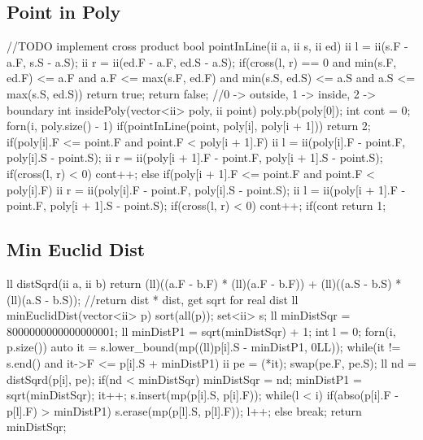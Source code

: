 \documentclass[10pt, landscape, twocolumn, a4paper, notitlepage]{article}
\begin{document}
\subsection{Point in Poly}
\begin{code}
//TODO implement cross product
bool pointInLine(ii a, ii s, ii ed) {
    ii l = ii(s.F - a.F, s.S - a.S);
    ii r = ii(ed.F - a.F, ed.S - a.S);
    if(cross(l, r) == 0 and min(s.F, ed.F) <= a.F and a.F <= max(s.F, ed.F)
        and min(s.S, ed.S) <= a.S and a.S <= max(s.S, ed.S)) 
        return true;
    return false;
}
//0 -> outside, 1 -> inside, 2 -> boundary
int insidePoly(vector<ii> poly, ii point) {
    poly.pb(poly[0]);
    int cont = 0;
    forn(i, poly.size() - 1) {
        if(pointInLine(point, poly[i], poly[i + 1])) return 2;
        if(poly[i].F <= point.F and point.F < poly[i + 1].F) {
            ii l = ii(poly[i].F - point.F, poly[i].S - point.S);
            ii r = ii(poly[i + 1].F - point.F, poly[i + 1].S - point.S);
            if(cross(l, r) < 0) cont++;
        }
        else if(poly[i + 1].F <= point.F and point.F < poly[i].F) {
            ii r = ii(poly[i].F - point.F, poly[i].S - point.S);
            ii l = ii(poly[i + 1].F - point.F, poly[i + 1].S - point.S);
            if(cross(l, r) < 0) cont++;
        }
    }
    if(cont%
    return 1;
}
\end{code}
\subsection{Min Euclid Dist}
\begin{code}
ll distSqrd(ii a, ii b) {
    return (ll)((a.F - b.F) * (ll)(a.F - b.F)) + (ll)((a.S - b.S) * (ll)(a.S - b.S));
} 
//return dist * dist, get sqrt for real dist
ll minEuclidDist(vector<ii> p) {
    sort(all(p));
    set<ii> s;
    ll minDistSqr = 8000000000000000001;
    ll minDistP1 = sqrt(minDistSqr) + 1;
    int l = 0;
    forn(i, p.size()) {
        auto it = s.lower_bound(mp((ll)p[i].S - minDistP1, 0LL));
        while(it != s.end() and it->F <= p[i].S + minDistP1) {
            ii pe = (*it);
            swap(pe.F, pe.S);
            ll nd = distSqrd(p[i], pe);
            if(nd < minDistSqr) {
                minDistSqr = nd;
                minDistP1 = sqrt(minDistSqr);
            }
            it++;
        }
        s.insert(mp(p[i].S, p[i].F));
        while(l < i) {
            if(abso(p[i].F - p[l].F) > minDistP1) {
                s.erase(mp(p[l].S, p[l].F));
                l++;
            }
            else break;
        }
    }
    return minDistSqr;
}
\end{code}
\end{document}
